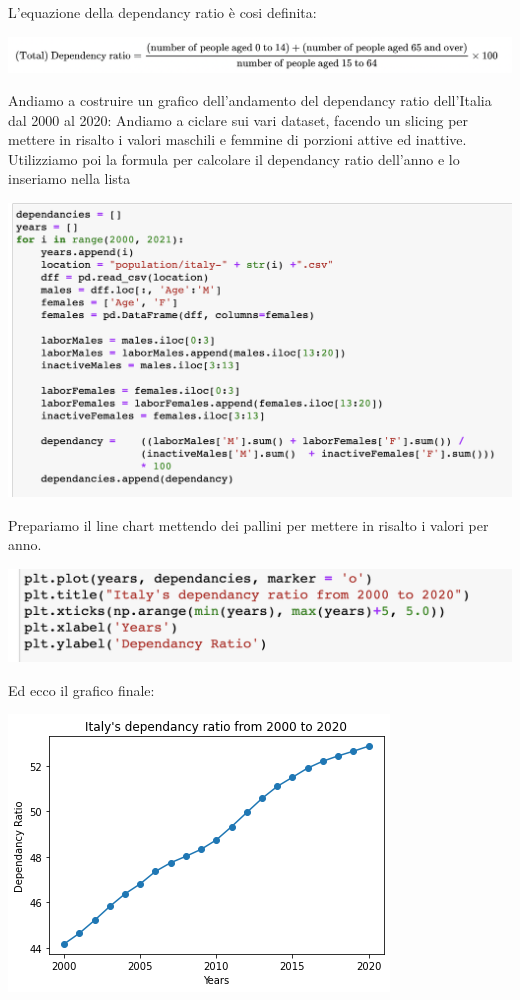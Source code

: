 \documentclass[11pt, oneside]{article}   	%
\begin{document}
L'equazione della dependancy ratio è cosi definita:
\begin{center}
\includegraphics[scale=0.5]{dependancy}
\end{center}
Andiamo a costruire un grafico dell'andamento del dependancy ratio dell'Italia dal 2000 al 2020:
Andiamo a ciclare sui vari dataset, facendo un slicing per mettere in risalto i valori maschili e femmine di porzioni attive ed inattive. Utilizziamo poi la formula per calcolare il dependancy ratio dell'anno e lo inseriamo nella lista
\begin{center}
\includegraphics[scale=0.5]{dep1}
\end{center}
Prepariamo il line chart mettendo dei pallini per mettere in risalto i valori per anno.
\begin{center}
\includegraphics[scale=0.5]{dep2}
\end{center}
Ed ecco il grafico finale:
\begin{center}
\includegraphics[scale=0.5]{dep3}
\end{center}
\end{document}
